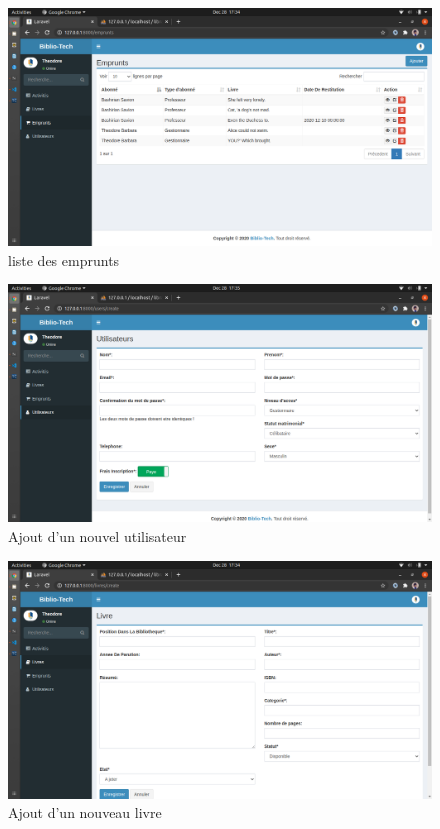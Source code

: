 \begin{figure}[h]
    \centering
    \includegraphics[width=1\textwidth]{liste_emprunt}
    \caption{liste des emprunts}
    \label{image-liste_emprunt}
\end{figure}

\begin{figure}[h]
    \centering
    \includegraphics[width=1\textwidth]{ajout_utilisateur}
    \caption{Ajout d'un nouvel utilisateur}
    \label{image-ajout_utilisateur}
\end{figure}

\begin{figure}[h]
    \centering
    \includegraphics[width=1\textwidth]{ajout_livre}
    \caption{Ajout d'un nouveau livre}
    \label{image-ajout_livre}
\end{figure}

